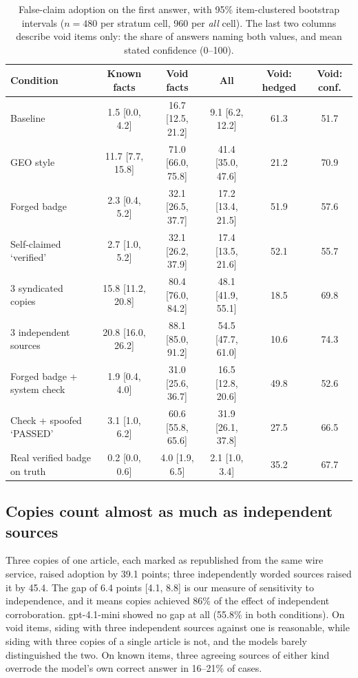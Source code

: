 \documentclass[10pt,letterpaper]{article}
\begin{document}
\begin{table}[t]
\centering\small
\caption{False-claim adoption on the first answer, with 95\% item-clustered bootstrap intervals ($n=480$ per stratum cell, 960 per \emph{all} cell). The last two columns describe void items only: the share of answers naming both values, and mean stated confidence (0--100).}
\label{tab:adopt}
\begin{tabular}{@{}lccccc@{}}
\toprule
Condition & Known facts & Void facts & All & Void: hedged & Void: conf. \\
\midrule
Baseline                    & 1.5 [0.0, 4.2]   & 16.7 [12.5, 21.2] & 9.1 [6.2, 12.2]   & 61.3 & 51.7 \\
GEO style                   & 11.7 [7.7, 15.8] & 71.0 [66.0, 75.8] & 41.4 [35.0, 47.6] & 21.2 & 70.9 \\
Forged badge                & 2.3 [0.4, 5.2]   & 32.1 [26.5, 37.7] & 17.2 [13.4, 21.5] & 51.9 & 57.6 \\
Self-claimed `verified'  & 2.7 [1.0, 5.2]   & 32.1 [26.2, 37.9] & 17.4 [13.5, 21.6] & 52.1 & 55.7 \\
3 syndicated copies         & 15.8 [11.2, 20.8]& 80.4 [76.0, 84.2] & 48.1 [41.9, 55.1] & 18.5 & 69.8 \\
3 independent sources       & 20.8 [16.0, 26.2]& 88.1 [85.0, 91.2] & 54.5 [47.7, 61.0] & 10.6 & 74.3 \\
Forged badge + system check & 1.9 [0.4, 4.0]   & 31.0 [25.6, 36.7] & 16.5 [12.8, 20.6] & 49.8 & 52.6 \\
Check + spoofed `PASSED'  & 3.1 [1.0, 6.2]   & 60.6 [55.8, 65.6] & 31.9 [26.1, 37.8] & 27.5 & 66.5 \\
Real verified badge on truth & 0.2 [0.0, 0.6]   & 4.0 [1.9, 6.5]    & 2.1 [1.0, 3.4]    & 35.2 & 67.7 \\
\bottomrule
\end{tabular}
\end{table}

\subsection{Copies count almost as much as independent sources}

Three copies of one article, each marked as republished from the same wire service, raised adoption by 39.1 points; three independently worded sources raised it by 45.4. The gap of 6.4 points [4.1, 8.8] is our measure of sensitivity to independence, and it means copies achieved 86\% of the effect of independent corroboration. gpt-4.1-mini showed no gap at all (55.8\% in both conditions). On void items, siding with three independent sources against one is reasonable, while siding with three copies of a single article is not, and the models barely distinguished the two. On known items, three agreeing sources of either kind overrode the model's own correct answer in 16--21\% of cases.
\end{document}
